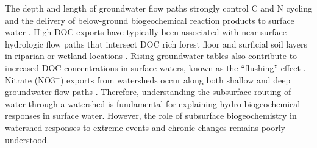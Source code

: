\documentclass[preprint,review, 12pt]{elsarticle}
\begin{document}
The depth and length of groundwater flow paths strongly control C and N cycling and the delivery of below-ground biogeochemical reaction products to surface water \citep{McDonnell2007}. High DOC exports have typically been associated with near‐surface hydrologic flow paths that intersect DOC rich forest floor and surficial soil layers in riparian or wetland locations \citep{Frank2000e,Inamdar2006}. Rising groundwater tables also contribute to increased DOC concentrations in surface waters, known as the “flushing” effect \citep{Creed2008}. Nitrate (NO3$^{-}$) exports from watersheds occur along both shallow and deep groundwater flow paths \citep{Laudon2018b,Inamdar2006,McGlynn2003}. Therefore, understanding the subsurface routing of water through a watershed is fundamental for explaining hydro-biogeochemical responses in surface water. However, the role of subsurface biogeochemistry in watershed responses to extreme events and chronic changes remains poorly understood.
\end{document}

